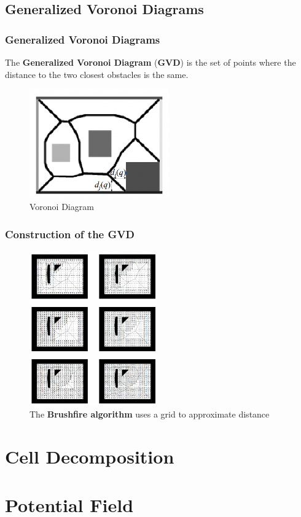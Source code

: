 \documentclass[handout]{beamer}
\begin{document}
  \subsection[Voronoi Diagrams]{Generalized Voronoi Diagrams}

  \begin{frame}
    \frametitle{Generalized Voronoi Diagrams}
    The \textbf{Generalized Voronoi Diagram} (\textbf{GVD}) is the set of points where the distance to the two closest obstacles is the same.
    \begin{center}
      \begin{figure}
        \includegraphics[width=60mm]{fig/fig_06_gvd.png}
        \caption{Voronoi Diagram}
        \label{fig:fig06}
      \end{figure}
     \end{center}
  
  \end{frame}

  \begin{frame}
    \frametitle{Construction of the GVD}
    \begin{center}
      \begin{figure}
        \includegraphics[width=55mm]{fig/fig_07_brushfire.png}
        \caption{The \textbf{Brushfire algorithm} uses a grid to approximate distance}
        \label{fig:fig07}
      \end{figure}
     \end{center}
  
  \end{frame}

  \section[Cell Decompositions]{Cell Decomposition}

  \section[Potential Field]{Potential Field}
\end{document}
